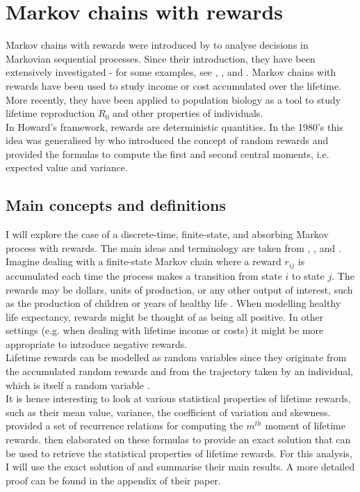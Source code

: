 \documentclass[\main/main.tex]{subfiles}
\begin{document}
\section{Markov chains with rewards}

Markov chains with rewards were introduced by \cite{Howard1960} to analyse decisions in Markovian sequential processes. Since their introduction, they have been extensively investigated - for some examples, see \cite{Howard1960}, \cite{Puterman1994}, and \cite{Sheskin2010}. Markov chains with rewards have been used to study income or cost accumulated over the lifetime. More recently, they have been applied to population biology as a tool to study lifetime reproduction $R_0$ \citep{Caswell2011, VanDaalen2015, VanDaalen2017} and other properties of individuals.\\

In Howard's framework, rewards are deterministic quantities. In the 1980's this idea was generalised by \cite{Benito1982} who introduced the concept of random rewards and provided the formulas to compute the first and second central moments, i.e. expected value and variance.


\subsection{Main concepts and definitions}
I will explore the case of a discrete-time, finite-state, and absorbing Markov process with rewards. The main ideas and terminology are taken from \cite{Howard1960}, \cite{Caswell2011}, and \cite{VanDaalen2017}.\\

\noindent Imagine dealing with a finite-state Markov chain where a reward $r_{ij}$ is accumulated each time the process makes a transition from state $i$ to state $j$. The rewards may be dollars, units of production, or any other output of interest, such as the production of children \citep{Caswell2011, VanDaalen2015, VanDaalen2017} or years of healthy life \citep{Caswell2018}.
When modelling healthy life expectancy, rewards might be thought of as being all positive. In other settings (e.g. when dealing with lifetime income or costs) it might be more appropriate to introduce negative rewards.\\

Lifetime rewards can be modelled as random variables since they originate from the accumulated random rewards and from the trajectory taken by an individual, which is itself a random variable  \citep{Caswell2011}.\\
It is hence interesting to look at various statistical properties of lifetime rewards, such as their mean value, variance, the coefficient of variation and skewness. \cite{Caswell2011} provided a set of recurrence relations for computing the $m^{th}$ moment of lifetime rewards. \cite{VanDaalen2017} then elaborated on these formulas to provide an exact solution that can be used to retrieve the statistical properties of lifetime rewards.  For this analysis, I will use the exact solution of \cite{VanDaalen2017} and summarise their main results. A more detailed proof can be found in the appendix of their paper.
\end{document}
